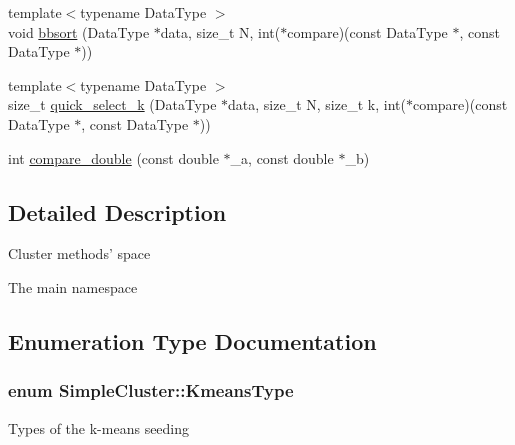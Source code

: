 \begin{DoxyCompactItemize}
{\footnotesize template$<$typename Data\-Type $>$ }\\void \hyperlink{namespaceSimpleCluster_acbdd21892a0a82f32c6d1851a7044f37}{bbsort} (Data\-Type $\ast$data, size\-\_\-t N, int($\ast$compare)(const Data\-Type $\ast$, const Data\-Type $\ast$))
\item 
{\footnotesize template$<$typename Data\-Type $>$ }\\size\-\_\-t \hyperlink{namespaceSimpleCluster_a3ff7d10652b776ae35a941228850d904}{quick\-\_\-select\-\_\-k} (Data\-Type $\ast$data, size\-\_\-t N, size\-\_\-t k, int($\ast$compare)(const Data\-Type $\ast$, const Data\-Type $\ast$))
\item 
int \hyperlink{namespaceSimpleCluster_a14624e6cca7beb136be3623222fb3acc}{compare\-\_\-double} (const double $\ast$\-\_\-a, const double $\ast$\-\_\-b)
\end{DoxyCompactItemize}


\subsection{Detailed Description}
Cluster methods' space

The main namespace 

\subsection{Enumeration Type Documentation}
\hypertarget{namespaceSimpleCluster_a8a8f57121b69a7b43575e4d6a53928e2}{
\subsubsection[{Kmeans\-Type}]{\setlength{\rightskip}{0pt plus 5cm}enum {\bf Simple\-Cluster\-::\-Kmeans\-Type}\hspace{0.3cm}{\ttfamily [strong]}}}\label{namespaceSimpleCluster_a8a8f57121b69a7b43575e4d6a53928e2}
Types of the k-\/means seeding 

